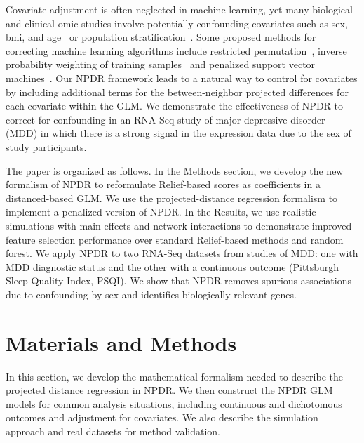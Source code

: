 \documentclass[10pt]{article}
\begin{document}
Covariate adjustment is often neglected in machine learning, yet many biological and clinical omic studies involve potentially confounding covariates such as sex, bmi, and age~\cite{le18_brainagesim} or population stratification~\cite{popstrat16}.
Some proposed methods for correcting machine learning algorithms include restricted permutation~\cite{rao2017}, inverse probability weighting of training samples~\cite{linn2016} and penalized support vector machines~\cite{li2011ccsvm}.
Our NPDR framework leads to a natural way to control for covariates by including additional terms for the between-neighbor projected differences for each covariate within the GLM.
We demonstrate the effectiveness of NPDR to correct for confounding in an RNA-Seq study of major depressive disorder (MDD) in which there is a strong signal in the expression data due to the sex of study participants. 

The paper is organized as follows.
In the Methods section, we develop the new formalism of NPDR to reformulate Relief-based scores as coefficients in a distanced-based GLM.
We use the projected-distance regression formalism to implement a penalized version of NPDR. 
In the Results, we use realistic simulations with main effects and network interactions to demonstrate improved feature selection performance over standard Relief-based methods and random forest. 
We apply NPDR to two RNA-Seq datasets from studies of MDD: one with MDD diagnostic status and the other with a continuous outcome (Pittsburgh Sleep Quality Index, PSQI).
We show that NPDR removes spurious associations due to confounding by sex and identifies biologically relevant genes.



\section{Materials and Methods}
In this section, we develop the mathematical formalism needed to describe the projected distance regression in NPDR. We then construct the NPDR GLM models for common analysis situations, including continuous and dichotomous outcomes and adjustment for covariates. We also describe the simulation approach and real datasets for method validation. 
\end{document}
